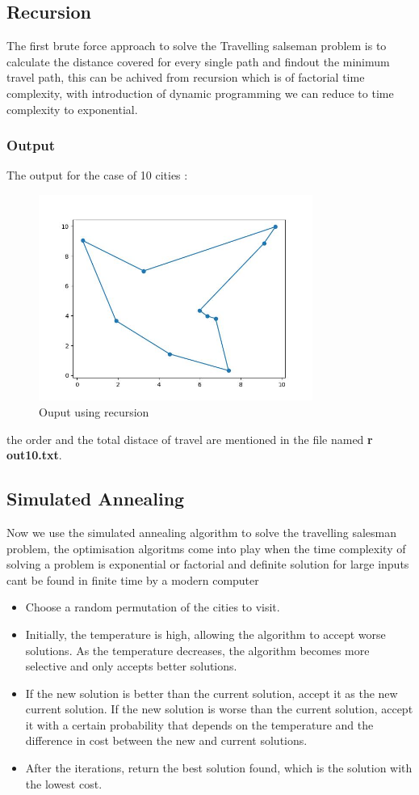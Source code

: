 \documentclass[titlepage, 11pt]{article}
\begin{document}
\subsection{Recursion}
The first brute force approach to solve the Travelling salseman problem is to calculate the distance covered for every single path
and findout the minimum travel path, this can be achived from recursion which is of factorial time complexity, with introduction of 
dynamic programming we can reduce to time complexity to exponential.

\subsubsection{Output}
The output for the case of 10 cities : 
\begin{figure}[ht]
    \centering
    \includegraphics[width=0.8\textwidth]{r_tsp10.jpeg}
    \caption{Ouput using recursion}
    \label{fig:tsp 10 jpeg}
\end{figure}
the order and the total distace of travel are mentioned in the file named \textbf{r out10.txt}.

\subsection{Simulated Annealing}
Now we use the simulated annealing algorithm to solve the travelling salesman problem, the optimisation algoritms come into 
play when the time complexity  of solving a problem is exponential or factorial and definite solution for large inputs cant be found in 
finite time by a modern computer
\begin{itemize}
    \item Choose a random permutation of the cities to visit.
    \item Initially, the temperature is high, allowing the algorithm to accept worse solutions.
    As the temperature decreases, the algorithm becomes more selective and only accepts better solutions.
    \item If the new solution is better than the current solution, accept it as the new current solution.
    If the new solution is worse than the current solution, accept it with a certain probability that depends on the temperature and the difference in cost between the new and current solutions.
    \item After the iterations, return the best solution found, which is the solution with the lowest cost.
\end{itemize}
\end{document}
